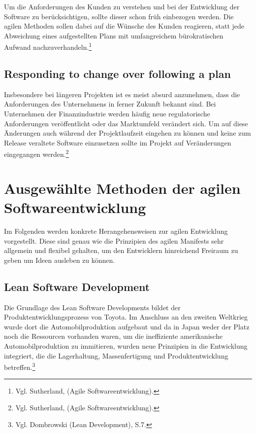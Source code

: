             Um die Anforderungen des Kunden zu verstehen und bei der Entwicklung der Software zu berücksichtigen, sollte dieser schon früh einbezogen werden. Die agilen Methoden sollen dabei auf die Wünsche des Kunden reagieren, statt jede Abweichung eines aufgestellten Plans mit umfangreichem bürokratischen Aufwand nachzuverhandeln.\footnote{Vgl. Sutherland, (Agile Softwareentwicklung).}

        \subsection{Responding to change over following a plan}

            Insbesondere bei längeren Projekten ist es meist absurd anzunehmen, dass die Anforderungen des Unternehmens in ferner Zukunft bekannt sind. Bei Unternehmen der Finanzindustrie werden häufig neue regulatorische Anforderungen veröffentlicht oder das Marktumfeld verändert sich. Um auf diese Änderungen auch während der Projektlaufzeit eingehen zu können und keine zum Release veraltete Software einzusetzen sollte im Projekt auf Veränderungen eingegangen werden.\footnote{Vgl. Sutherland, (Agile Softwareentwicklung).}

%
%
    \section{Ausgewählte Methoden der agilen Softwareentwicklung}
    \label{sec:agileMethoden}

        Im Folgenden werden konkrete Herangehensweisen zur agilen Entwicklung vorgestellt. Diese sind genau wie die Prinzipien des agilen Manifests sehr allgemein und flexibel gehalten, um den Entwicklern hinreichend Freiraum zu geben um Ideen ausleben zu können.

        \subsection{Lean Software Development}

            Die Grundlage des Lean Software Developments bildet der Produktentwicklungsprozess von Toyota. Im Anschluss an den zweiten Weltkrieg wurde dort die Automobilproduktion aufgebaut und da in Japan weder der Platz noch die Ressourcen vorhanden waren, um die ineffiziente amerikanische Automobilproduktion zu immitieren, wurden neue Prinzipien in die Entwicklung integriert, die die Lagerhaltung, Massenfertigung und Produktentwicklung betreffen.\footnote{Vgl. Dombrowski (Lean Development), S.7.}

